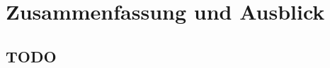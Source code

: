 \newpage
\slidetitle{}
\section{Zusammenfassung und Ausblick}


\begin{center}
\end{center}

\newpage
{}
\subsection{TODO}

